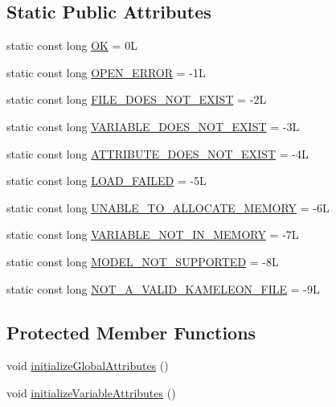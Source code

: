 \subsection*{Static Public Attributes}
\begin{DoxyCompactItemize}
\item 
static const long \hyperlink{classccmc_1_1_file_reader_aab750fd06ff3cb56cea326bae6be4fe3}{O\-K} = 0\-L
\item 
static const long \hyperlink{classccmc_1_1_file_reader_adb92217d29e5a045beb74cbd33fa1f21}{O\-P\-E\-N\-\_\-\-E\-R\-R\-O\-R} = -\/1\-L
\item 
static const long \hyperlink{classccmc_1_1_file_reader_ab4a996faba7e78310b97b50d33ab6fbe}{F\-I\-L\-E\-\_\-\-D\-O\-E\-S\-\_\-\-N\-O\-T\-\_\-\-E\-X\-I\-S\-T} = -\/2\-L
\item 
static const long \hyperlink{classccmc_1_1_file_reader_aeb45af0e04f8c758b9664855653efce7}{V\-A\-R\-I\-A\-B\-L\-E\-\_\-\-D\-O\-E\-S\-\_\-\-N\-O\-T\-\_\-\-E\-X\-I\-S\-T} = -\/3\-L
\item 
static const long \hyperlink{classccmc_1_1_file_reader_ac651d2c5e15642b127057786b9c25eb6}{A\-T\-T\-R\-I\-B\-U\-T\-E\-\_\-\-D\-O\-E\-S\-\_\-\-N\-O\-T\-\_\-\-E\-X\-I\-S\-T} = -\/4\-L
\item 
static const long \hyperlink{classccmc_1_1_file_reader_acd08f0557fb0ed45f5ffd1a9e5451bf4}{L\-O\-A\-D\-\_\-\-F\-A\-I\-L\-E\-D} = -\/5\-L
\item 
static const long \hyperlink{classccmc_1_1_file_reader_a4dba9101e377f5ed430c3a5e10af09ac}{U\-N\-A\-B\-L\-E\-\_\-\-T\-O\-\_\-\-A\-L\-L\-O\-C\-A\-T\-E\-\_\-\-M\-E\-M\-O\-R\-Y} = -\/6\-L
\item 
static const long \hyperlink{classccmc_1_1_file_reader_a0fc7cfefa991aca0f26f2f533d4031ff}{V\-A\-R\-I\-A\-B\-L\-E\-\_\-\-N\-O\-T\-\_\-\-I\-N\-\_\-\-M\-E\-M\-O\-R\-Y} = -\/7\-L
\item 
static const long \hyperlink{classccmc_1_1_file_reader_aaedbd53a3604e301a2df207e732a26b7}{M\-O\-D\-E\-L\-\_\-\-N\-O\-T\-\_\-\-S\-U\-P\-P\-O\-R\-T\-E\-D} = -\/8\-L
\item 
static const long \hyperlink{classccmc_1_1_file_reader_af9f2d879c5e0d936eed0a14991662c8b}{N\-O\-T\-\_\-\-A\-\_\-\-V\-A\-L\-I\-D\-\_\-\-K\-A\-M\-E\-L\-E\-O\-N\-\_\-\-F\-I\-L\-E} = -\/9\-L
\end{DoxyCompactItemize}
\subsection*{Protected Member Functions}
\begin{DoxyCompactItemize}
\item 
void \hyperlink{classccmc_1_1_file_reader_a38580b9175bb58240630ed1c98147209}{initialize\-Global\-Attributes} ()
\item 
void \hyperlink{classccmc_1_1_file_reader_a9a5bc837ba6c1ccba7543fe934b9879b}{initialize\-Variable\-Attributes} ()
\end{DoxyCompactItemize}
